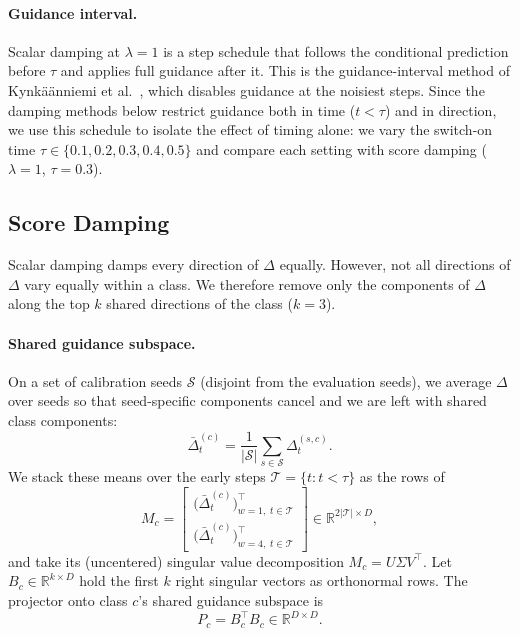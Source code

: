 \documentclass[sigconf,nonacm]{acmart}
\begin{document}
\paragraph{Guidance interval.}
Scalar damping at $\lambda = 1$ is a step schedule that follows the conditional prediction before $\tau$ and applies full guidance after it. This is the guidance-interval method of Kynk\"a\"anniemi et al.~\cite{kynkaanniemi2024interval}, which disables guidance at the noisiest steps. Since the damping methods below restrict guidance both in time ($t < \tau$) and in direction, we use this schedule to isolate the effect of timing alone: we vary the switch-on time $\tau \in \{0.1, 0.2, 0.3, 0.4, 0.5\}$ and compare each setting with score damping ($\lambda = 1$, $\tau = 0.3$).

\subsection{Score Damping}
\label{sec:score}

Scalar damping damps every direction of $\Delta$ equally. However, not all directions of $\Delta$ vary equally within a class. We therefore remove only the components of $\Delta$ along the top $k$ shared directions of the class ($k=3$).

\paragraph{Shared guidance subspace.}
On a set of calibration seeds $\mathcal{S}$ (disjoint from the evaluation seeds), we average $\Delta$ over seeds so that seed-specific components cancel and we are left with shared class components:
\begin{equation}
  \bar{\Delta}_t^{(c)} = \frac{1}{|\mathcal{S}|} \sum_{s \in \mathcal{S}} \Delta_t^{(s,c)} .
  \label{eq:mean-delta}
\end{equation}
We stack these means over the early steps $\mathcal{T} = \{t : t < \tau\}$ as the rows of
\begin{equation}
  M_c = \begin{bmatrix}
    \big(\bar{\Delta}_t^{(c)}\big)^{\!\top}_{w=1,\; t \in \mathcal{T}} \\[2pt]
    \big(\bar{\Delta}_t^{(c)}\big)^{\!\top}_{w=4,\; t \in \mathcal{T}}
  \end{bmatrix}
  \in \mathbb{R}^{2|\mathcal{T}| \times D},
  \label{eq:stack}
\end{equation}
and take its (uncentered) singular value decomposition $M_c = U \Sigma V^{\top}$. Let $B_c \in \mathbb{R}^{k \times D}$ hold the first $k$ right singular vectors as orthonormal rows. The projector onto class $c$'s shared guidance subspace is
\begin{equation}
  P_c = B_c^{\top} B_c \in \mathbb{R}^{D \times D} .
  \label{eq:projector}
\end{equation}
\end{document}
